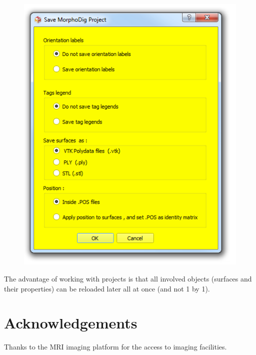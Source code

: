 \documentclass[12pt, a4paper]{book}
\begin{document}
\begin{figure}
  \centering  
 \includegraphics[scale=0.5]{../images/07/project/save_ntw.png}
\label{save_project_file}
\end{figure}

The advantage of working with projects is that all involved objects (surfaces and their properties) can be reloaded later all at once (and not 1 by 1). 

\section{Acknowledgements}
Thanks to the MRI imaging platform for the access to imaging facilities.




 		
\end{document}
